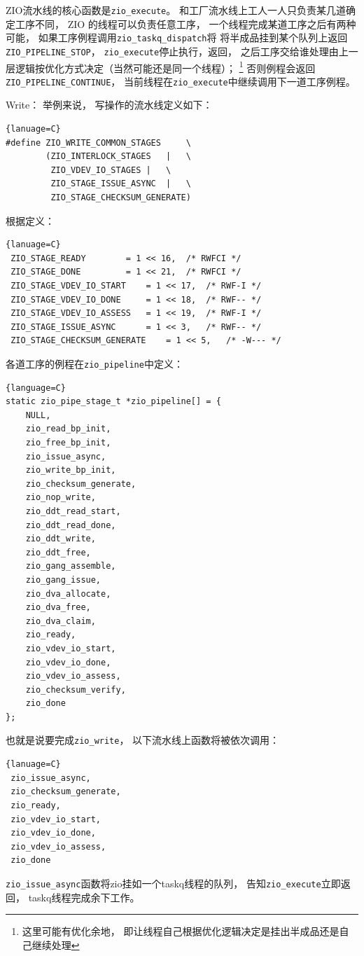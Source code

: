 ZIO流水线的核心函数是\verb|zio_execute|。
和工厂流水线上工人一人只负责某几道确定工序不同，
ZIO 的线程可以负责任意工序，
一个线程完成某道工序之后有两种可能，
如果工序例程调用\verb|zio_taskq_dispatch|将
将半成品挂到某个队列上返回\verb|ZIO_PIPELINE_STOP|，
\verb|zio_execute|停止执行，返回，
之后工序交给谁处理由上一层逻辑按优化方式决定（当然可能还是同一个线程）；%
\footnote{这里可能有优化余地，
  即让线程自己根据优化逻辑决定是挂出半成品还是自己继续处理}
否则例程会返回\verb|ZIO_PIPELINE_CONTINUE|，
当前线程在\verb|zio_execute|中继续调用下一道工序例程。

Write：
举例来说，
写操作的流水线定义如下：

\begin{lstlisting}{lanuage=C}
#define ZIO_WRITE_COMMON_STAGES		\
        (ZIO_INTERLOCK_STAGES	|	\
         ZIO_VDEV_IO_STAGES	|	\
         ZIO_STAGE_ISSUE_ASYNC	|	\
         ZIO_STAGE_CHECKSUM_GENERATE)
\end{lstlisting}

根据定义：

\begin{lstlisting}{lanuage=C}
 ZIO_STAGE_READY		= 1 << 16,	/* RWFCI */
 ZIO_STAGE_DONE			= 1 << 21,	/* RWFCI */
 ZIO_STAGE_VDEV_IO_START	= 1 << 17,	/* RWF-I */
 ZIO_STAGE_VDEV_IO_DONE		= 1 << 18,	/* RWF-- */
 ZIO_STAGE_VDEV_IO_ASSESS	= 1 << 19,	/* RWF-I */
 ZIO_STAGE_ISSUE_ASYNC		= 1 << 3,	/* RWF-- */
 ZIO_STAGE_CHECKSUM_GENERATE	= 1 << 5,	/* -W--- */
\end{lstlisting}

各道工序的例程在\verb|zio_pipeline|中定义：
\begin{lstlisting}{language=C}
static zio_pipe_stage_t *zio_pipeline[] = {
	NULL,
	zio_read_bp_init,
	zio_free_bp_init,
	zio_issue_async,
	zio_write_bp_init,
	zio_checksum_generate,
	zio_nop_write,
	zio_ddt_read_start,
	zio_ddt_read_done,
	zio_ddt_write,
	zio_ddt_free,
	zio_gang_assemble,
	zio_gang_issue,
	zio_dva_allocate,
	zio_dva_free,
	zio_dva_claim,
	zio_ready,
	zio_vdev_io_start,
	zio_vdev_io_done,
	zio_vdev_io_assess,
	zio_checksum_verify,
	zio_done
};
\end{lstlisting}

也就是说要完成\verb|zio_write|，
以下流水线上函数将被依次调用：
\begin{lstlisting}{lanuage=C}
 zio_issue_async,
 zio_checksum_generate,
 zio_ready,
 zio_vdev_io_start,
 zio_vdev_io_done,
 zio_vdev_io_assess,
 zio_done
\end{lstlisting}

\verb|zio_issue_async|函数将zio挂如一个taskq线程的队列，
告知\verb|zio_execute|立即返回，
taskq线程完成余下工作。

